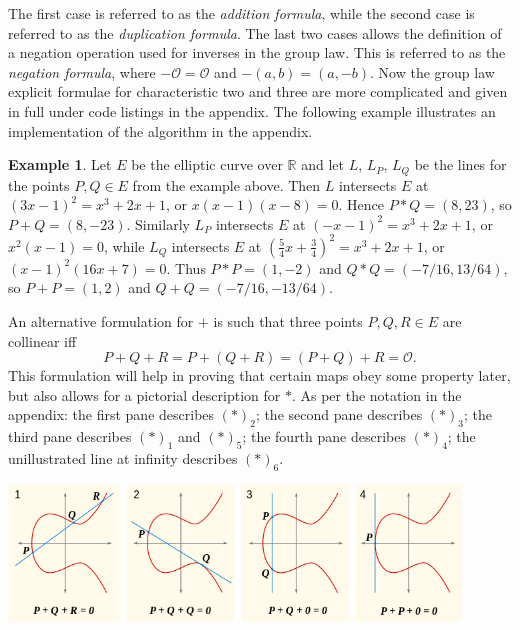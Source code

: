 \documentclass{article}
\newcommand{\R}{\mathbb{R}}
\newcommand{\rb}[1]{\left( #1 \right)}
\theoremstyle{definition}
\newtheorem*{example}{Example}
\begin{document}
The first case is referred to as the \emph{addition formula}, while the second case is referred to as the \emph{duplication formula}. The last two cases allows the definition of a negation operation used for inverses in the group law. This is referred to as the \emph{negation formula}, where $ -\mathcal{O} = \mathcal{O} $ and $ -\rb{a, b} = \rb{a, -b} $. Now the group law explicit formulae for characteristic two and three are more complicated and given in full under code listings in the appendix. The following example illustrates an implementation of the algorithm in the appendix.

\begin{example}
Let $ E $ be the elliptic curve over $ \R $ and let $ L $, $ L_P $, $ L_Q $ be the lines for the points $ P, Q \in E $ from the example above. Then $ L $ intersects $ E $ at $ \rb{3x - 1}^2 = x^3 + 2x + 1 $, or $ x\rb{x - 1}\rb{x - 8} = 0 $. Hence $ P * Q = \rb{8, 23} $, so $ P + Q = \rb{8, -23} $. Similarly $ L_P $ intersects $ E $ at $ \rb{-x - 1}^2 = x^3 + 2x + 1 $, or $ x^2\rb{x - 1} = 0 $, while $ L_Q $ intersects $ E $ at $ \rb{\tfrac{5}{4}x + \tfrac{3}{4}}^2 = x^3 + 2x + 1 $, or $ \rb{x - 1}^2\rb{16x + 7} = 0 $. Thus $ P * P = \rb{1, -2} $ and $ Q * Q = \rb{-7 / 16, 13 / 64} $, so $ P + P = \rb{1, 2} $ and $ Q + Q = \rb{-7 / 16, -13 / 64} $.
\end{example}

An alternative formulation for $ + $ is such that three points $ P, Q, R \in E $ are collinear iff
$$ P + Q + R = P + \rb{Q + R} = \rb{P + Q} + R = \mathcal{O}. $$
This formulation will help in proving that certain maps obey some property later, but also allows for a pictorial description for $ * $. As per the notation in the appendix: the first pane describes $ \rb{*}_2 $; the second pane describes $ \rb{*}_3 $; the third pane describes $ \rb{*}_1 $ and $ \rb{*}_5 $; the fourth pane describes $ \rb{*}_4 $; the unillustrated line at infinity describes $ \rb{*}_6 $.
\begin{center}
\includegraphics*[width=0.9\textwidth]{ECClines.png}
\end{center}
\end{document}

